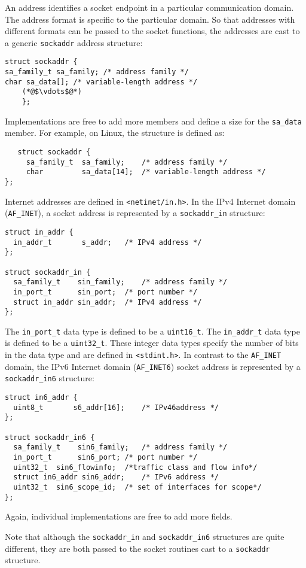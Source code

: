 \documentclass[12pt, letterpaper]{article}
\theoremstyle{definition}
\let\cd\lstinline
\begin{document}
An address identifies a socket endpoint in a particular communication domain. The address format is specific to the particular domain. So that addresses with different formats can be passed to the socket functions, the addresses are cast to a generic \cd+sockaddr+ address structure:
\begin{lstlisting}
struct sockaddr {
sa_family_t sa_family; /* address family */
char sa_data[]; /* variable-length address */
	(*@$\vdots$@*)
	};
\end{lstlisting}

Implementations are free to add more members and define a size for the \cd+sa_data+ member. For example, on Linux, the structure is defined as:
\begin{lstlisting}
   struct sockaddr {
     sa_family_t  sa_family;    /* address family */
     char         sa_data[14];  /* variable-length address */
};
\end{lstlisting}
Internet addresses are defined in \cd+<netinet/in.h>+. In the IPv4 Internet domain (\cd+AF_INET+), a socket address is represented by a \cd+sockaddr_in+ structure:
\begin{lstlisting}
struct in_addr {
  in_addr_t       s_addr;	/* IPv4 address */
};

struct sockaddr_in {
  sa_family_t    sin_family;	/* address family */
  in_port_t      sin_port;	/* port number */
  struct in_addr sin_addr;	/* IPv4 address */
};
\end{lstlisting}
The \cd+in_port_t+ data type is defined to be a \cd+uint16_t+. The \cd+in_addr_t+ data type is defined to be a \cd+uint32_t+. These integer data types specify the number of bits in the data type and are defined in \cd+<stdint.h>+.
In contrast to the \cd+AF_INET+ domain, the IPv6 Internet domain (\cd+AF_INET6+) socket address is represented by a \cd+sockaddr_in6+ structure:

\begin{lstlisting}
struct in6_addr {
  uint8_t       s6_addr[16];	/* IPv46address */
};

struct sockaddr_in6 {
  sa_family_t    sin6_family;	/* address family */
  in_port_t      sin6_port;	/* port number */
  uint32_t	sin6_flowinfo;	/*traffic class and flow info*/
  struct in6_addr sin6_addr;	/* IPv6 address */
  uint32_t	sin6_scope_id;	/* set of interfaces for scope*/
};
\end{lstlisting}
Again, individual implementations are free to add more fields.

Note that although the \cd+sockaddr_in+ and \cd+sockaddr_in6+ structures are quite different, they are both passed to the socket routines cast to a \cd+sockaddr+ structure.
\end{document}
